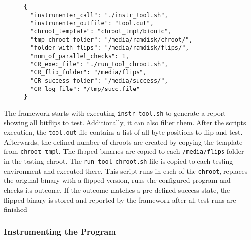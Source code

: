 \begin{figure}
\begin{minipage}{\linewidth}
\begin{lstlisting}[style=nasm,
                   caption={JSON style config file for the framework, showing
all parameters used to tweak each part of the framework. Entries
starting with \texttt{CR\_} are used inside the testing \texttt{chroot}.},
                   label={lst:expconfig}]
{
  "instrumenter_call": "./instr_tool.sh",
  "instrumenter_outfile": "tool.out",
  "chroot_template": "chroot_tmpl/bionic",
  "tmp_chroot_folder": "/media/ramdisk/chroot/",
  "folder_with_flips": "/media/ramdisk/flips/",
  "num_of_parallel_checks": 1,
  "CR_exec_file": "./run_tool_chroot.sh",
  "CR_flip_folder": "/media/flips",
  "CR_success_folder": "/media/success/",
  "CR_log_file": "/tmp/succ.file"
}
\end{lstlisting}
\end{minipage}
\end{figure}

The framework starts with executing \texttt{instr\_tool.sh} to generate a report
showing all bitflips to test. Additionally, it can also filter them. After the
script\textquotesingle s execution, the \texttt{tool.out}-file contains a list
of all byte positions to flip and test. Afterwards, the defined number of
chroots are created by copying the template from \texttt{chroot\_tmpl}. The
flipped binaries are copied to each \texttt{/media/flips} folder in the testing
chroot. The \texttt{run\_tool\_chroot.sh} file is copied to each testing
environment and executed there. This script runs in each of the \texttt{chroot},
replaces the original binary with a flipped version, runs the configured program
and checks it\textquotesingle s outcome. If the outcome matches a pre-defined
success state, the flipped binary is stored and reported by the framework after
all test runs are finished.

\subsubsection{Instrumenting the Program}

